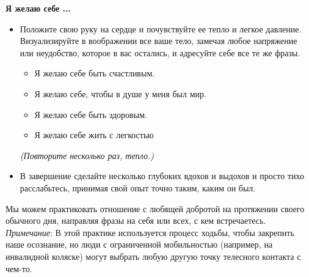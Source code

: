 {\large \textbf{Я желаю себе ...}}
\begin{itemize}
	\item Положите свою руку на сердце и почувствуйте ее тепло и легкое давление. Визуализируйте в воображении все ваше тело, замечая любое напряжение или неудобство, которое в вас остались, и адресуйте себе все те же фразы.
	\begin{itemize}
		\item Я желаю себе быть счастливым.
		\item Я желаю себе, чтобы в душе у меня был мир.
		\item Я желаю себе быть здоровым.
		\item Я желаю себе жить с легкостью
	\end{itemize}
	\emph{(Повторите несколько раз, тепло.)}
	\item В завершение сделайте несколько глубоких вдохов и выдохов и просто тихо расслабьтесь, принимая свой опыт точно таким, каким он был. 
\end{itemize}

\newpage
{}

\newpage
{} \label{IP:Walking_in_Loving-Kindness}

Мы можем практиковать отношение с любящей добротой на протяжении своего обычного дня, направляя фразы на себя или всех, с кем встречаетесь. \emph{Примечание}: В этой практике используется процесс ходьбы, чтобы закрепить наше осознание, но люди с ограниченной мобильностью (например, на инвалидной коляске) могут выбрать любую другую точку телесного контакта с чем-то.

